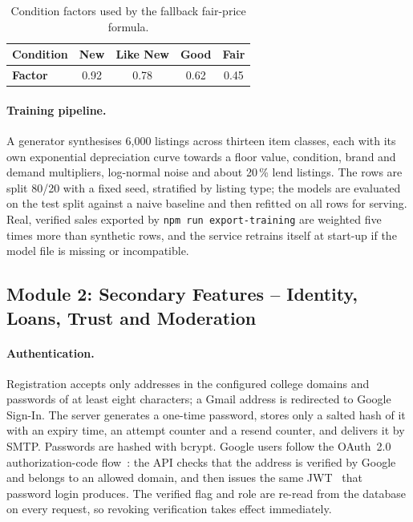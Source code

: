 \documentclass[12pt,letterpaper,twoside,openany]{report}
\newcommand{\code}[1]{\texttt{#1}}
\begin{document}
\begin{table}[htbp]
\centering
\caption{Condition factors used by the fallback fair-price formula.}\label{tab:cond}
\small
\begin{tabular}{@{}lcccc@{}}
\toprule
\textbf{Condition} & New & Like New & Good & Fair\\
\midrule
\textbf{Factor} & 0.92 & 0.78 & 0.62 & 0.45\\
\bottomrule
\end{tabular}
\end{table}

\paragraph{Training pipeline.} A generator synthesises 6{,}000 listings across thirteen item classes, each
with its own exponential depreciation curve towards a floor value, condition, brand and demand multipliers,
log-normal noise and about 20\,\% lend listings. The rows are split 80/20 with a fixed seed, stratified by
listing type; the models are evaluated on the test split against a naive baseline and then refitted on all
rows for serving. Real, verified sales exported by \code{npm run export-training} are weighted five times
more than synthetic rows, and the service retrains itself at start-up if the model file is missing or
incompatible.

\subsection{Module 2: Secondary Features -- Identity, Loans, Trust and Moderation}
\paragraph{Authentication.} Registration accepts only addresses in the configured college domains and
passwords of at least eight characters; a Gmail address is redirected to Google Sign-In. The server
generates a one-time password, stores only a salted hash of it with an expiry time, an attempt counter and a
resend counter, and delivers it by SMTP. Passwords are hashed with bcrypt. Google users follow the OAuth~2.0
authorization-code flow~\cite{oauth}: the API checks that the address is verified by Google and belongs to
an allowed domain, and then issues the same JWT~\cite{jwt} that password login produces. The verified flag
and role are re-read from the database on every request, so revoking verification takes effect immediately.
\end{document}
